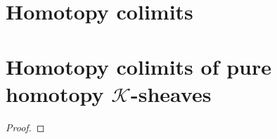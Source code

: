 \section{Homotopy colimits}

\begin{definition}\label{def:homotopy_diagram}

\end{definition}

\begin{definition}\label{def:homotopy_colimit}
\end{definition}

\section{Homotopy colimits of pure homotopy $\mathcal{K}$-sheaves}

\begin{lemma}\label{lem:hocolim_preserves_homotopy_k_sheaves}
\end{lemma}

\begin{proof}

\end{proof}

\begin{lemma}\label{lem:gluing_pure_homotopy_k_sheaves}
\end{lemma}